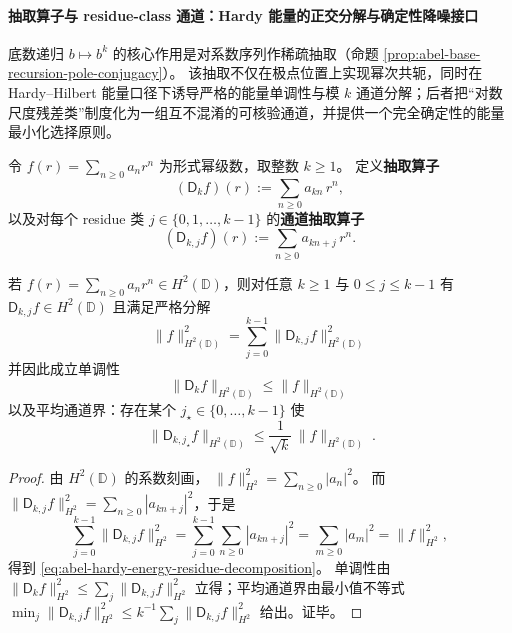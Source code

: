 \paragraph{抽取算子与 residue-class 通道：Hardy 能量的正交分解与确定性降噪接口}
底数递归 \(b\mapsto b^k\) 的核心作用是对系数序列作稀疏抽取（命题 \ref{prop:abel-base-recursion-pole-conjugacy}）。
该抽取不仅在极点位置上实现幂次共轭，同时在 Hardy--Hilbert 能量口径下诱导严格的能量单调性与模 \(k\) 通道分解；后者把“对数尺度残差类”制度化为一组互不混淆的可核验通道，并提供一个完全确定性的能量最小化选择原则。

\begin{definition}\label{def:abel-decimation-operators}
令 \(f(r)=\sum_{n\ge 0}a_n r^n\) 为形式幂级数，取整数 \(k\ge 1\)。
定义\textbf{抽取算子}
\[
(\mathsf D_k f)(r):=\sum_{n\ge 0}a_{kn}\,r^n,
\]
以及对每个 residue 类 \(j\in\{0,1,\dots,k-1\}\) 的\textbf{通道抽取算子}
\[
(\mathsf D_{k,j} f)(r):=\sum_{n\ge 0}a_{kn+j}\,r^n.
\]
\end{definition}

\begin{proposition}\label{prop:abel-hardy-energy-decimation-orthogonal}
若 \(f(r)=\sum_{n\ge 0}a_nr^n\in H^2(\mathbb D)\)，则对任意 \(k\ge 1\) 与 \(0\le j\le k-1\) 有 \(\mathsf D_{k,j}f\in H^2(\mathbb D)\) 且满足严格分解
\begin{equation}\label{eq:abel-hardy-energy-residue-decomposition}
\boxed{\;
\|f\|_{H^2(\mathbb D)}^2=\sum_{j=0}^{k-1}\|\mathsf D_{k,j}f\|_{H^2(\mathbb D)}^2\;}
\end{equation}
并因此成立单调性
\[
\boxed{\;\|\mathsf D_k f\|_{H^2(\mathbb D)}\le \|f\|_{H^2(\mathbb D)}\;}
\]
以及平均通道界：存在某个 \(j_\star\in\{0,\dots,k-1\}\) 使
\[
\boxed{\;\|\mathsf D_{k,j_\star}f\|_{H^2(\mathbb D)}\le \frac{1}{\sqrt{k}}\,\|f\|_{H^2(\mathbb D)}\; }.
\]
\end{proposition}
\begin{proof}
由 \(H^2(\mathbb D)\) 的系数刻画，
\(
\|f\|_{H^2}^2=\sum_{n\ge 0}|a_n|^2
\)。
而 \(\|\mathsf D_{k,j}f\|_{H^2}^2=\sum_{n\ge 0}|a_{kn+j}|^2\)，于是
\[
\sum_{j=0}^{k-1}\|\mathsf D_{k,j}f\|_{H^2}^2
=\sum_{j=0}^{k-1}\sum_{n\ge 0}|a_{kn+j}|^2
=\sum_{m\ge 0}|a_m|^2
=\|f\|_{H^2}^2,
\]
得到 \eqref{eq:abel-hardy-energy-residue-decomposition}。
单调性由 \(\|\mathsf D_k f\|_{H^2}^2\le \sum_{j}\|\mathsf D_{k,j}f\|_{H^2}^2\) 立得；平均通道界由最小值不等式
\(
\min_j \|\mathsf D_{k,j}f\|_{H^2}^2\le k^{-1}\sum_j\|\mathsf D_{k,j}f\|_{H^2}^2
\)
给出。证毕。
\end{proof}

